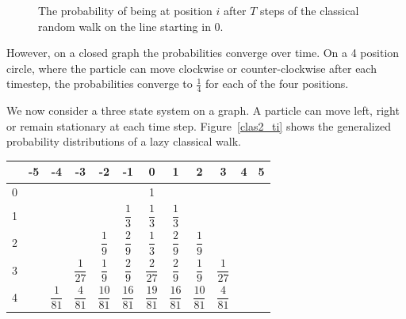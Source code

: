 \documentclass[a0,portrait]{a0poster}
\begin{document}
\begin{center}
{\begin{figure}
\caption{The probability of being at position $i$ after $T$ steps of the classical random walk on the line starting in 0.}
\label{clas_ti}
\end{figure}    

However, on a closed graph the probabilities converge over time. On a 4 position circle, where the particle can move clockwise or counter-clockwise after each timestep, the probabilities converge to $\frac{1}{4}$ for each of the four positions.

We now consider a three state system on a graph. A particle can move left, right or remain stationary at each time step. Figure~\ref{clas2_ti} shows the generalized probability distributions of a lazy classical walk.

\begin{center}
\small
\begin{tabular}{|c||c|c|c|c|c|c|c|c|c|c|c|}
\hline 
& -5 & -4 & -3 & -2 & -1 & 0 & 1 & 2 & 3 & 4 & 5 \\
\hline \hline
\hspace*{\fill} 0 \hspace*{\fill} &  &  &  &  &  & 1 &  &  &  &  & \\
\hline 
1 &  &  &  &  & 
$\dfrac{ 1 }{ 3 }$ &
$\dfrac{ 1 }{ 3 }$ &
$\dfrac{ 1 }{ 3 }$ &  &  &  & 
\hspace*{\fill} \\
\hline 
2 &  &  &  & 
$\dfrac{1}{9}$ & 
$\dfrac{ 2 }{ 9 }$ & 
$\dfrac{1}{3}$ & 
$\dfrac{ 2 }{ 9 }$ & 
$\dfrac{1}{9}$ &  &  & 
\hspace*{\fill} \\
\hline 
3 &  &  &  
$\dfrac{1}{27}$ &  
$\dfrac{ 1 }{ 9 }$ & 
$\dfrac{2}{9}$ &  
$\dfrac{ 2 }{ 27 }$ & 
$\dfrac{2}{9}$ &  
$\dfrac{ 1 }{ 9 }$ & 
$\dfrac{1}{27}$  &  & 
\hspace*{\fill} \\
\hline 
4 &  &
\hspace*{\fill} $\dfrac{1}{81}$ \hspace*{\fill} & 
$\dfrac{ 4 }{ 81 }$ & 
\hspace*{\fill} $\dfrac{10}{81}$ \hspace*{\fill} &  
$\dfrac{ 16 }{ 81 }$ & 
\hspace*{\fill} $\dfrac{19}{81}$ \hspace*{\fill} &  
$\dfrac{ 16 }{ 81 }$ & 
\hspace*{\fill} $\dfrac{10}{81}$ \hspace*{\fill} &  
$\dfrac{ 4 }{ 81 }$ & 

\end{tabular}
\end{center}}
\end{center}
\end{document}

